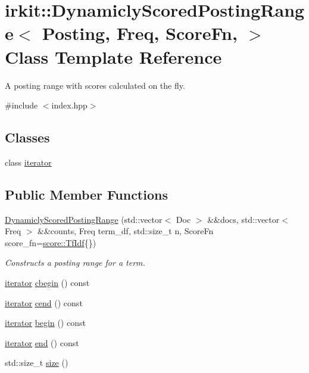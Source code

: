 \hypertarget{classirkit_1_1DynamiclyScoredPostingRange}{}\section{irkit\+:\+:Dynamicly\+Scored\+Posting\+Range$<$ Posting, Freq, Score\+Fn, $>$ Class Template Reference}
\label{classirkit_1_1DynamiclyScoredPostingRange}


A posting range with scores calculated on the fly.  




{\ttfamily \#include $<$index.\+hpp$>$}

\subsection*{Classes}
\begin{DoxyCompactItemize}
\item 
class \hyperlink{classirkit_1_1DynamiclyScoredPostingRange_1_1iterator}{iterator}
\end{DoxyCompactItemize}
\subsection*{Public Member Functions}
\begin{DoxyCompactItemize}
\item 
\hyperlink{classirkit_1_1DynamiclyScoredPostingRange_a505ae46df58b541505dcc795df5e045d}{Dynamicly\+Scored\+Posting\+Range} (std\+::vector$<$ Doc $>$ \&\&docs, std\+::vector$<$ Freq $>$ \&\&counts, Freq term\+\_\+df, std\+::size\+\_\+t n, Score\+Fn score\+\_\+fn=\hyperlink{structirkit_1_1score_1_1TfIdf}{score\+::\+Tf\+Idf}\{\})
\begin{DoxyCompactList}\small\item\em Constructs a posting range for a term. \end{DoxyCompactList}\item 
\hyperlink{classirkit_1_1DynamiclyScoredPostingRange_1_1iterator}{iterator} \hyperlink{classirkit_1_1DynamiclyScoredPostingRange_a9fe9532cee4feaeefe305e8593f436b6}{cbegin} () const
\item 
\hyperlink{classirkit_1_1DynamiclyScoredPostingRange_1_1iterator}{iterator} \hyperlink{classirkit_1_1DynamiclyScoredPostingRange_a85219c57f0da94d00d1ed1c8f041d976}{cend} () const
\item 
\hyperlink{classirkit_1_1DynamiclyScoredPostingRange_1_1iterator}{iterator} \hyperlink{classirkit_1_1DynamiclyScoredPostingRange_a6a9d369c6e38b5a2b39cbbacb0dc5bed}{begin} () const
\item 
\hyperlink{classirkit_1_1DynamiclyScoredPostingRange_1_1iterator}{iterator} \hyperlink{classirkit_1_1DynamiclyScoredPostingRange_a6d0857abfae0edcf8a2c5d63916dfbb1}{end} () const
\item 
std\+::size\+\_\+t \hyperlink{classirkit_1_1DynamiclyScoredPostingRange_a3a080b946216c0caf02eb9749c8e2e2e}{size} ()
\end{DoxyCompactItemize}


